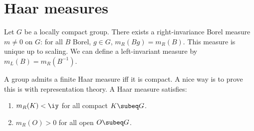 
\section{Haar measures}

Let $G$ be a locally compact group. There exists a right-invariance Borel measure $m\ne 0$ on $G$: for all $B$ Borel, $g\in G$, $m_R(Bg)=m_R(B)$. This measure is unique up to scaling. We can define a left-invariant measure by $m_L(B) = m_R(B^{-1})$. 

A group admits a finite Haar measure iff it is compact. 
A nice way is to prove this is with representation theory. 
A Haar measure satisfies:
\begin{enumerate}
\item
$m_R(K)<\iy$ for all compact $K\subeq G$. 
\item
$m_R(O)>0$ for all open $O\subeq G$.
\end{enumerate}

